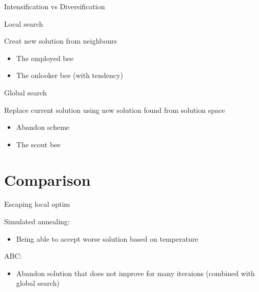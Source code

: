 \documentclass[14pt,ignorenonframetext,compress]{beamer}
\providecommand{\tightlist}{%
  \setlength{\itemsep}{0pt}\setlength{\parskip}{0pt}}
\begin{document}
\begin{frame}{Intensification vs Diversification}
\protect\hypertarget{intensification-vs-diversification}{}

\begin{block}{Local search}

Creat new solution from neighbours

\begin{itemize}
\tightlist
\item
  The employed bee
\item
  The onlooker bee (with tendency)
\end{itemize}

\pause

\end{block}

\begin{block}{Global search}

Replace current solution using new solution found from solution space

\begin{itemize}
\tightlist
\item
  Abandon scheme
\item
  The scout bee
\end{itemize}

\end{block}

\end{frame}

\hypertarget{comparison}{%
\section{Comparison}\label{comparison}}

\begin{frame}{Escaping local optim}
\protect\hypertarget{escaping-local-optim}{}

Simulated annealing:

\begin{itemize}
\tightlist
\item
  Being able to accept worse solution based on temperature
\end{itemize}

\pause

ABC:

\begin{itemize}
\tightlist
\item
  Abandon solution that does not improve for many iteraions (combined
  with global search)
\end{itemize}

\end{frame}
\end{document}
